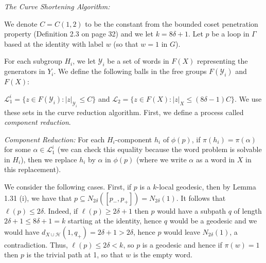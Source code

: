 \documentclass[12pt]{article}
\newcommand{\vs}{\vskip10pt}
\begin{document}
	\vs 
	
	\textit{The Curve Shortening Algorithm: } 
	
	\vs 
	
	We denote $C = C(1,2)$ to be the constant from the bounded coset penetration property (Definition 2.3 on page 32) and we let $k = 8\delta + 1$. Let $p$ be a loop in $\Gamma$ based at the identity with label $w$ (so that $w = 1$ in $G$). 
	
	\vs 
	
	For each subgroup $H_i$, we let $\mathcal{Y}_i$ be a set of words in $F(X)$ representing the generators in $Y_i$. We define the following balls in the free groups $F(\mathcal{Y}_i)$ and $F(X)$: 
	
	\vs 
	
	$\mathcal{L}_1^i = \{z \in F(\mathcal{Y}_i): \vert z \vert_{\mathcal{Y}_i} \leq C\}$ and $\mathcal{L}_2 = \{z \in F(X): \vert z \vert_X \leq (8 \delta-1)C\}$. We use these sets in the curve reduction algorithm. First, we define a process called \textit{component reduction}. 
	
	\vs 
	
	\textit{Component Reduction: } For each $H_i$-component $h_i$ of $\phi(p)$, if $\pi(h_i) = \pi(\alpha)$ for some $\alpha \in \mathcal{L}_1^i$ (we can check this equality because the word problem is solvable in $H_i$), then we replace $h_i$ by $\alpha$ in $\phi(p)$ (where we write $\alpha$ as a word in $X$ in this replacement).  
	
	\vs 
	
	We consider the following cases. First, if $p$ is a $k$-local geodesic, then by Lemma 1.31 (i), we have that $p \subseteq N_{2 \delta}([p_-, p_+]) = N_{2 \delta}(1)$. It follows that $\ell(p) \leq 2 \delta$. Indeed, if $\ell(p) \geq 2 \delta + 1$ then $p$ would have a subpath $q$ of length $2 \delta + 1 \leq 8 \delta + 1 = k$ starting at the identity, hence $q$ would be a geodesic and we would have $d_{X \cup \mathcal{H}}(1, q_+) = 2 \delta + 1 > 2 \delta$, hence $p$ would leave $N_{2 \delta}(1)$, a contradiction. Thus, $\ell(p) \leq 2 \delta < k$, so $p$ is a geodesic and hence if $\pi(w) = 1$ then $p$ is the trivial path at 1, so that $w$ is the empty word. 
	
	\vs 
	
\end{document}
